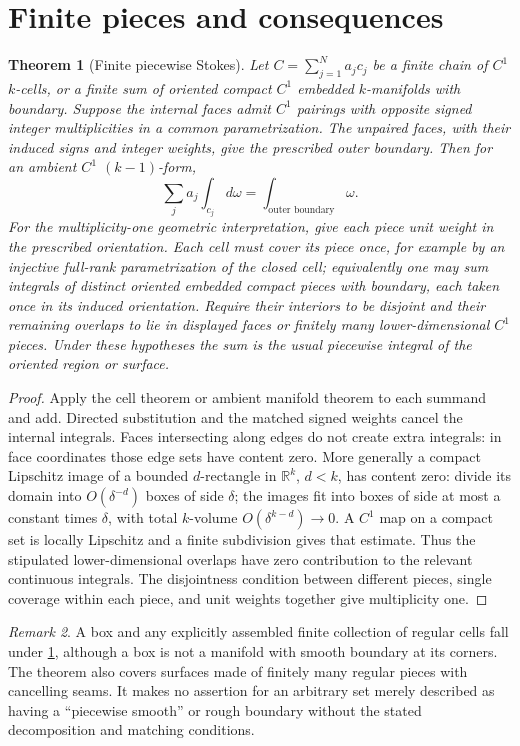 \documentclass[11pt,oneside,openany]{book}
\newtheorem{theorem}{Theorem}[chapter]
\theoremstyle{definition}
\theoremstyle{remark}
\newtheorem{remark}[theorem]{Remark}
\newcommand{\R}{\mathbb R}
\newcommand{\family}[1]{}
\begin{document}
\section{Finite pieces and consequences}
\family{K04.15.08}\family{K04.15.09}
\begin{theorem}[Finite piecewise Stokes]\label{d04:15:piecewise}
Let $C=\sum_{j=1}^N a_jc_j$ be a finite chain of $C^1$ $k$-cells, or a
finite sum of oriented compact $C^1$ embedded $k$-manifolds with boundary.
Suppose the internal faces admit $C^1$ pairings with opposite signed
integer multiplicities in a common parametrization. The unpaired faces,
with their induced signs and integer weights, give the prescribed outer
boundary. Then for
an ambient $C^1$ $(k-1)$-form,
\[
 \sum_j a_j\int_{c_j}d\omega=\int_{\text{outer boundary}}\omega.
\]
For the multiplicity-one geometric interpretation, give each piece unit
weight in the prescribed orientation. Each cell must cover its piece
once, for example by an injective full-rank parametrization of the
closed cell; equivalently one may sum integrals of distinct oriented
embedded compact pieces with boundary, each taken once in its induced
orientation. Require their interiors to be disjoint and their remaining
overlaps to lie in displayed faces or finitely many lower-dimensional
$C^1$ pieces. Under these hypotheses the sum is the usual piecewise
integral of the oriented region or surface.
\end{theorem}
\begin{proof}
Apply the cell theorem or ambient manifold theorem to each summand and add.
Directed substitution and the matched signed weights cancel the internal
integrals. Faces intersecting along edges do not create extra integrals:
in face coordinates those edge sets have content zero. More generally a
compact Lipschitz image of a bounded $d$-rectangle in $\R^k$, $d<k$, has
content zero: divide its domain into $O(\delta^{-d})$ boxes of side
$\delta$; the images fit into boxes of side at most a constant times
$\delta$, with total $k$-volume $O(\delta^{k-d})\to0$.
A $C^1$ map on a compact set is locally Lipschitz and a finite subdivision
gives that estimate. Thus the stipulated lower-dimensional overlaps have
zero contribution to the relevant continuous integrals. The disjointness
condition between different pieces, single coverage within each piece, and unit weights together give multiplicity one.
\end{proof}

\begin{remark}\label{d04:15:corners-scope}
A box and any explicitly assembled finite collection of regular cells fall
under \cref{d04:15:piecewise}, although a box is not a manifold with smooth
boundary at its corners. The theorem also covers surfaces made of finitely
many regular pieces with cancelling seams. It makes no assertion for an
arbitrary set merely described as having a ``piecewise smooth'' or rough
boundary without the stated decomposition and matching conditions.
\end{remark}
\end{document}
